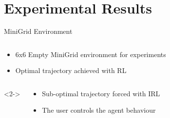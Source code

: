 \section{Experimental Results}

\begin{frame}{MiniGrid Environment}

\begin{columns}
        \begin{column}{0.6\textwidth}
        \small{        
            \begin{itemize}
                \item 6x6 Empty MiniGrid environment for experiments
                \item Optimal trajectory achieved with RL
            \end{itemize}
        }
            
        \end{column}
        \begin{column}{0.4\textwidth}
        \end{column}
        
    \end{columns}

\begin{columns}<2->
        \begin{column}{0.6\textwidth}
        \small{        
            \begin{itemize}
                \item Sub-optimal trajectory forced with IRL
                \item The user controls the agent behaviour
            \end{itemize}
        }
            

\end{column}
\end{columns}
\end{frame}
